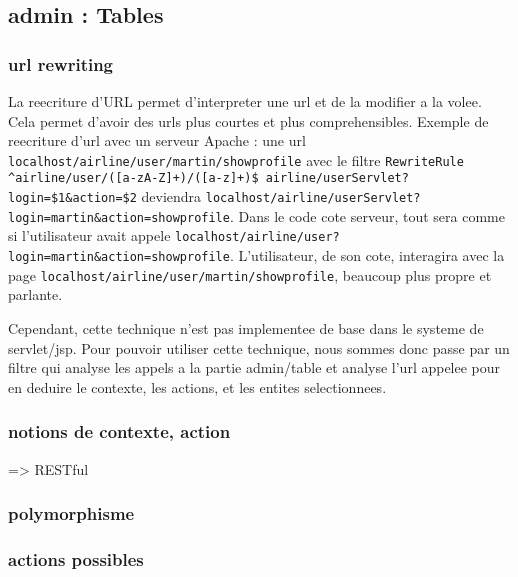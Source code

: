 \subsection{admin : Tables}

\subsubsection{url rewriting}
La reecriture d'URL permet d'interpreter une url et de la modifier a la volee. Cela permet d'avoir des urls plus courtes et plus comprehensibles. Exemple de reecriture d'url avec un serveur Apache :
une url \verb|localhost/airline/user/martin/showprofile| avec le filtre \verb|RewriteRule ^airline/user/([a-zA-Z]+)/([a-z]+)$ airline/userServlet?login=$1&action=$2| deviendra \verb|localhost/airline/userServlet?login=martin&action=showprofile|. Dans le code cote serveur, tout sera comme si l'utilisateur avait appele \verb|localhost/airline/user?login=martin&action=showprofile|. L'utilisateur, de son cote, interagira avec la page \verb|localhost/airline/user/martin/showprofile|, beaucoup plus propre et parlante.

Cependant, cette technique n'est pas implementee de base dans le systeme de servlet/jsp. Pour pouvoir utiliser cette technique, nous sommes donc passe par un filtre qui analyse les appels a la partie admin/table et analyse l'url appelee pour en deduire le contexte, les actions, et les entites selectionnees.

\subsubsection{notions de contexte, action}
=> RESTful

\subsubsection{polymorphisme}
\subsubsection{actions possibles}
